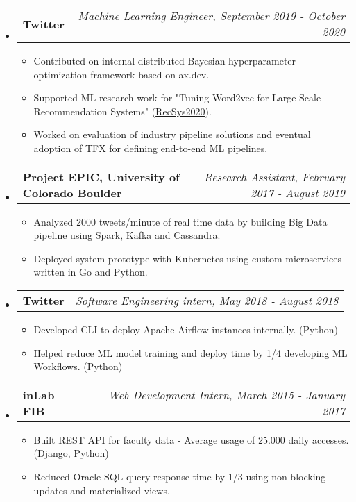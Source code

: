 \documentclass[letterpaper,10pt]{article}
\makeatletter
\newcommand{\resitem}[1]{\item #1 \vspace{-2pt}}
\newcommand{\ressubheading}[4]{
\begin{tabular*}{7.0in}{l@{\extracolsep{\fill}}r}
		\textbf{#1} & \textit{#4} \\
\end{tabular*}\vspace{-6pt}}
\makeatother
\begin{document}
\begin{itemize}
\begin{itemize}
				
			\end{itemize}
		\item
			\ressubheading{Twitter}{Boulder, CO}{Machine Learning Engineer}{Machine Learning Engineer, September 2019 - October 2020}
			\begin{itemize}
				\resitem{Contributed on internal distributed Bayesian hyperparameter optimization framework based on ax.dev.} 
				\resitem{Supported ML research work for "Tuning Word2vec for Large Scale Recommendation Systems" (\href{https://arxiv.org/pdf/2009.12192.pdf}{RecSys2020}).}
				\resitem{Worked on evaluation of industry pipeline solutions and eventual adoption of TFX for defining end-to-end ML pipelines.}
			\end{itemize}
		\item
			\ressubheading{Project EPIC, University of Colorado Boulder}{Boulder, CO}{Research Assistant}{Research Assistant, February 2017 - August 2019}
			\begin{itemize}
				\resitem{Analyzed 2000 tweets/minute of real time data by building Big Data pipeline using Spark, Kafka and Cassandra.} 
				\resitem{Deployed system prototype with Kubernetes using custom microservices written in Go and Python.}
			\end{itemize}
			\item
			\ressubheading{Twitter}{Boulder, CO}{Software Engineering intern}{Software Engineering intern, May 2018 - August 2018}
			\begin{itemize}
				\resitem{Developed CLI to deploy Apache Airflow instances internally. (Python)}
				\resitem{Helped reduce ML model training and deploy time by 1/4 developing \href{https://blog.twitter.com/engineering/en_us/topics/insights/2018/ml-workflows.html}{ML Workflows}. (Python)}
			\end{itemize}
		\item
			\ressubheading{inLab FIB}{Barcelona, Spain}{Web Development Intern}{Web Development Intern, March 2015 - January 2017}
			\begin{itemize}
				\resitem{Built REST API for faculty data - Average usage of 25.000 daily accesses. (Django, Python)}
				\resitem{Reduced Oracle SQL query response time by 1/3 using non-blocking updates and materialized views.}
			\end{itemize}


\end{itemize}
\end{document}
